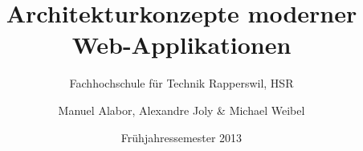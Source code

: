 \subject{Bachelorarbeit}
\date{Frühjahressemester 2013}
\title{Architekturkonzepte moderner Web-Applikationen}
\subtitle{Fachhochschule für Technik Rapperswil, HSR}
\author{Manuel Alabor, Alexandre Joly \& Michael Weibel}

\maketitle